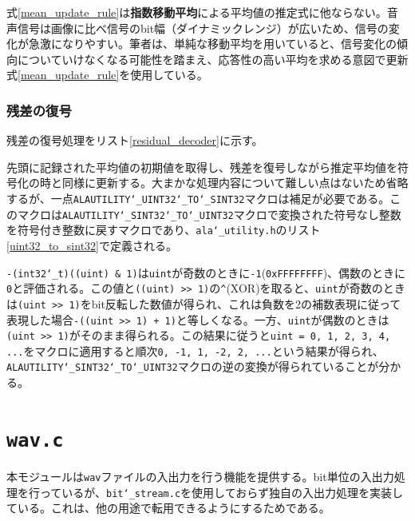 \documentclass[uplatex,dvipdfmx,b5j,10pt]{jsbook}
\theoremstyle{definition}
\begin{document}
式\ref{mean_update_rule}は\textbf{指数移動平均}による平均値の推定式に他ならない。音声信号は画像に比べ信号のbit幅（ダイナミックレンジ）が広いため、信号の変化が急激になりやすい。筆者は、単純な移動平均を用いていると、信号変化の傾向についていけなくなる可能性を踏まえ、応答性の高い平均を求める意図で更新式\ref{mean_update_rule}を使用している。

\subsubsection{残差の復号}

残差の復号処理をリスト\ref{residual_decoder}に示す。


先頭に記録された平均値の初期値を取得し、残差を復号しながら推定平均値を符号化の時と同様に更新する。大まかな処理内容について難しい点はないため省略するが、一点\texttt{ALAUTILITY\char`_UINT32\char`_TO\char`_SINT32}マクロは補足が必要である。このマクロは\texttt{ALAUTILITY\char`_SINT32\char`_TO\char`_UINT32}マクロで変換された符号なし整数を符号付き整数に戻すマクロであり、\texttt{ala\char`_utility.h}のリスト\ref{uint32_to_sint32}で定義される。


\texttt{-(int32\char`_t)((uint) \& 1)}は\texttt{uint}が奇数のときに\texttt{-1}(\texttt{0xFFFFFFFF})、偶数のときに\texttt{0}と評価される。この値と\texttt{((uint) >> 1)}の\texttt{\^}(XOR)を取ると、\texttt{uint}が奇数のときは\texttt{(uint >> 1)}をbit反転した数値が得られ、これは負数を2の補数表現に従って表現した場合\texttt{-((uint >> 1) + 1)}と等しくなる。一方、\texttt{uint}が偶数のときは\texttt{(uint >> 1)}がそのまま得られる。この結果に従うと\texttt{uint = 0, 1, 2, 3, 4, ...}をマクロに適用すると順次\texttt{0, -1, 1, -2, 2, ...}という結果が得られ、\texttt{ALAUTILITY\char`_SINT32\char`_TO\char`_UINT32}マクロの逆の変換が得られていることが分かる。

\section{\texttt{wav.c}}

本モジュールは\texttt{wav}ファイルの入出力を行う機能を提供する。bit単位の入出力処理を行っているが、\texttt{bit\char`_stream.c}を使用しておらず独自の入出力処理を実装している。これは、他の用途で転用できるようにするためである。
\end{document}
